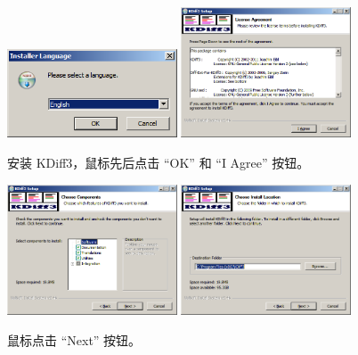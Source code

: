 \documentclass{article}
\begin{document}
\begin{figure}[ht]\centering
  \includegraphics[width=0.45\textwidth]{figures/git/set8-1.png}
  \includegraphics[width=0.45\textwidth]{figures/git/set8-2.png}
  \caption{安装 KDiff3，鼠标先后点击 ``OK'' 和 ``I Agree'' 按钮。}\label{fig:set8-1}
\end{figure}

\begin{figure}[ht]\centering
  \includegraphics[width=0.45\textwidth]{figures/git/set8-3.png}
  \includegraphics[width=0.45\textwidth]{figures/git/set8-4.png}
  \caption{鼠标点击 ``Next'' 按钮。}\label{fig:set8-3}
\end{figure}
\end{document}
